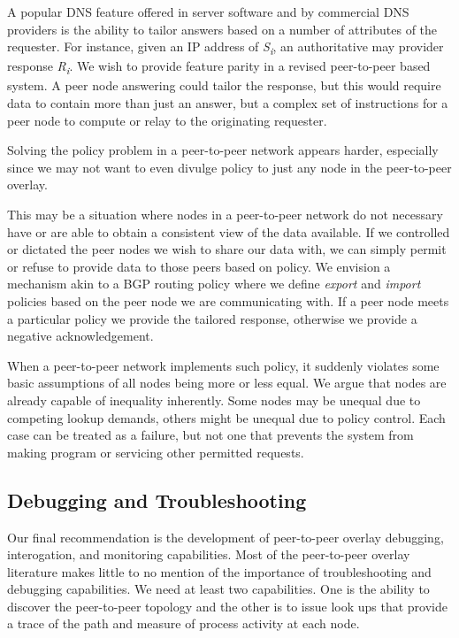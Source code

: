 \documentclass[sigconf]{acmart}
\begin{document}
A popular DNS feature offered in server software and by commercial DNS
providers is the ability to tailor answers based on a number of
attributes of the requester.  For instance, given an IP address of
\emph{S\textsubscript{i}}, an authoritative may provider response
\emph{R\textsubscript{i}}.  We wish to provide feature parity in a revised
peer-to-peer based system.  A peer node answering could tailor the
response, but this would require data to contain more than just an
answer, but a complex set of instructions for a peer node to compute or
relay to the originating requester.

Solving the policy problem in a peer-to-peer network appears harder,
especially since we may not want to even divulge policy to just any node
in the peer-to-peer overlay.

This may be a situation where nodes in a peer-to-peer network do not
necessary have or are able to obtain a consistent view of the data
available.  If we controlled or dictated the peer nodes we wish to share
our data with, we can simply permit or refuse to provide data to those
peers based on policy.  We envision a mechanism akin to a BGP routing
policy where we define \emph{export} and \emph{import} policies based on
the peer node we are communicating with.  If a peer node meets a
particular policy we provide the tailored response, otherwise we provide
a negative acknowledgement.

When a peer-to-peer network implements such policy, it suddenly violates
some basic assumptions of all nodes being more or less equal.  We argue
that nodes are already capable of inequality inherently.  Some nodes may
be unequal due to competing lookup demands, others might be unequal due
to policy control.  Each case can be treated as a failure, but not one
that prevents the system from making program or servicing other
permitted requests.

\subsection{Debugging and Troubleshooting}

Our final recommendation is the development of peer-to-peer overlay
debugging, interogation, and monitoring capabilities.  Most of the
peer-to-peer overlay literature makes little to no mention of the
importance of troubleshooting and debugging capabilities.  We need at
least two capabilities.  One is the ability to discover the peer-to-peer
topology and the other is to issue look ups that provide a trace of the
path and measure of process activity at each node.
\end{document}

